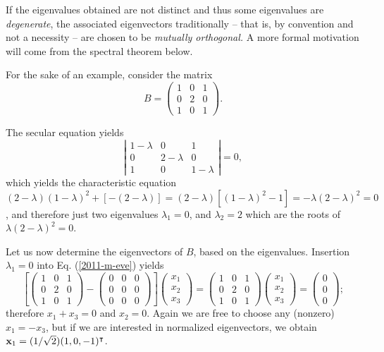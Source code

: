 If the eigenvalues obtained are not distinct and thus some eigenvalues are {\em degenerate},
the associated eigenvectors traditionally -- that is, by convention and not a necessity -- are chosen to be
{\em mutually orthogonal.}
A more formal motivation will come from the spectral theorem below.


{\color{blue}
\bexample
For the sake of an example, consider  the
{matrix}
\begin{equation}
B=
\begin{pmatrix}
1&0&1\\
0&2&0\\
1&0&1
\end{pmatrix}.
\label{2017-m-ch-fdvs-e-eev2}
\end{equation}

The secular equation yields
$$
\left|
\begin{matrix}
1-\lambda &0&1\\
0&2-\lambda &0\\
1&0&1-\lambda
\end{matrix}
\right| = 0,
$$
which yields the characteristic equation
$
(2-\lambda )(1-\lambda )^2 +[-(2-\lambda )]=
(2-\lambda )[(1-\lambda )^2 -1]=
-\lambda (2-\lambda )^2 =0$,
and therefore just two  eigenvalues
$\lambda_1=0$,  and
$\lambda_2=2$ which are the roots of $\lambda (2-\lambda )^2 =0$.

Let us now determine the eigenvectors of $B$, based on the eigenvalues.
Insertion  $\lambda_1=0$ into Eq. (\ref{2011-m-eve})  yields
\begin{equation}
\left[
\begin{pmatrix}
1&0&1\\
0&2&0\\
1&0&1
\end{pmatrix}  -
\begin{pmatrix}
0&0&0\\
0&0&0\\
0&0&0
\end{pmatrix}
\right]
\begin{pmatrix}
x_1\\
x_2\\
x_3
\end{pmatrix}
=
\begin{pmatrix}
1&0&1\\
0&2&0\\
1&0&1
\end{pmatrix}
\begin{pmatrix}
x_1\\
x_2\\
x_3
\end{pmatrix}
=
\begin{pmatrix}
0\\
0\\
0
\end{pmatrix}
;
\end{equation}
therefore $x_1+x_3=0$ and $x_2=0$.
Again we are free to choose any (nonzero) $x_1=-x_3$,
but if we are interested in normalized eigenvectors, we obtain
${\bf x}_1 =(1/\sqrt{2})(1,0,-1)^\intercal $.

}
